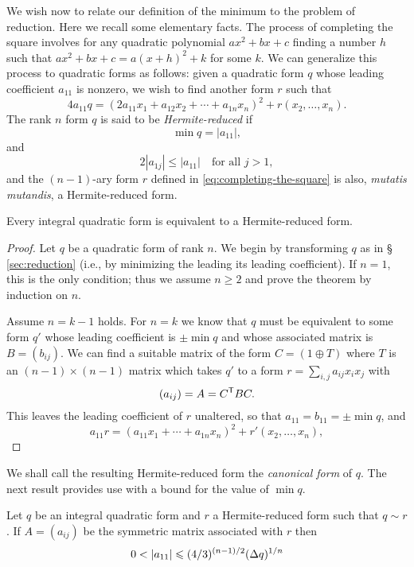 We wish now to relate our definition of the minimum to the problem of reduction. Here we recall some elementary facts. The process of completing the square involves for any quadratic polynomial \(ax^2 + bx + c\) finding a number \(h\) such that \(ax^2 + bx + c = a(x + h)^2 + k\) for some \(k\). We can generalize this process to quadratic forms as follows: given a quadratic form \(q\) whose leading coefficient \(a_{11}\) is nonzero, we wish to find another form \(r\) such that
\begin{equation}
  \label{eq:completing-the-square}
  4a_{11}q = (2a_{11}x_1 + a_{12}x_2 + \cdots + a_{1n}x_n)^2 + r(x_2, \dots, x_n).
\end{equation}
The rank \(n\) form \(q\) is said to be \emph{Hermite-reduced} if
\[
  \min q = |a_{11}|,
\]
and
\[
  2|a_{1j}| \leq |a_{11}| \quad \text{for all } j > 1,
\]
and the \((n-1)\)-ary form \(r\) defined in \eqref{eq:completing-the-square} is also, \emph{mutatis mutandis}, a Hermite-reduced form.

\begin{theoremx}
  {\normalfont \cite[p.~18ff]{watson1960integral}}
  Every integral quadratic form is equivalent to a Hermite-reduced form.
\end{theoremx}

\begin{proof}
  Let \(q\) be a quadratic form of rank \(n\). We begin by transforming \(q\) as in \S\,\ref{sec:reduction} (i.e., by minimizing the leading its leading coefficient). If \(n = 1\), this is the only condition; thus we assume \(n \geq 2\) and prove the theorem by induction on \(n\).

  Assume \(n = k - 1\) holds. For \(n = k\) we know that \(q\) must be equivalent to some form \(q'\) whose leading coefficient is \(\pm \min q\) and whose associated matrix is \(B = (b_{ij})\). We can find a suitable matrix of the form \(C = (1 \oplus T)\) where \(T\) is an \((n - 1) \times (n-1)\) matrix which takes \(q'\) to a form \(r = \sum_{i,j} a_{ij} x_i x_j\) with
  \[(a_{ij}) = A = C^{\mathsf{T}}BC.\]
  This leaves the leading coefficient of \(r\) unaltered, so that \(a_{11} = b_{11} = \pm \min q\), and
  \[
    a_{11}r = (a_{11}x_1 + \cdots + a_{1n}x_n)^2 + r'(x_2, \dots, x_n),
  \]
\end{proof}

We shall call the resulting Hermite-reduced form the \emph{canonical form} of \(q\). The next result provides use with a bound for the value of \(\min q\).

\begin{theoremx}
  {\normalfont \cite[p.~59ff]{jones1950arithmetic}}
  Let \(q\) be an integral quadratic form and \(r\) a Hermite-reduced form such that \(q \sim r\). If \(A = (a_{ij})\) be the symmetric matrix associated with \(r\) then
  \[
    0 < |a_{11}| \leqslant (4/3)^{(n-1)/2} ({{\Delta} q})^{1/n}
  \]
\end{theoremx}

